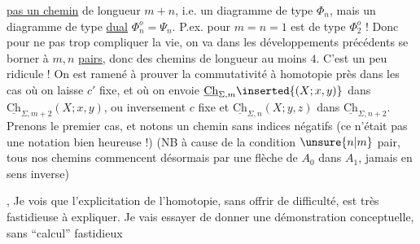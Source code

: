 \uline{pas un chemin} de longueur $m+n$, i.e. un diagramme de type $\Phi_n$, mais un diagramme de type \uline{dual} $\Phi_n^o=\Psi_n$. P.ex. pour $m=n=1$
est de type $\Phi_2^o$ ! Donc pour ne pas trop compliquer la vie, on va dans les développements précédents se borner à $m,n$ \uline{pairs}, donc des chemins de longueur au moins $4$. C'est un peu ridicule ! On est ramené à prouver la commutativité à homotopie près dans les cas où on laisse $c'$  fixe, et où on envoie $\underline{\mathrm{Ch}}_{\Sigma,m}\inserted{(X;x,y)}$ dans $\underline{\mathrm{Ch}}_{\Sigma,m+2}(X;x,y)$, ou inversement $c$ fixe et $\underline{\mathrm{Ch}}_{\Sigma,n}(X;y,z)$ dans $\underline{\mathrm{Ch}}_{\Sigma,n+2}$. Prenons le premier cas, et notons un chemin  sans indices négatifs (ce n'était pas une notation bien heureuse !)
(NB  à cause de la condition $\unsure{n|m}$ pair, tous nos chemins commencent désormais par une flèche de $A_0$ dans $A_1$, jamais en sens inverse) 

, Je vois que l'explicitation de l'homotopie, sans offrir de difficulté, est très fastidieuse à expliquer. Je  vais essayer de donner une démonstration conceptuelle, sans ``calcul'' fastidieux

